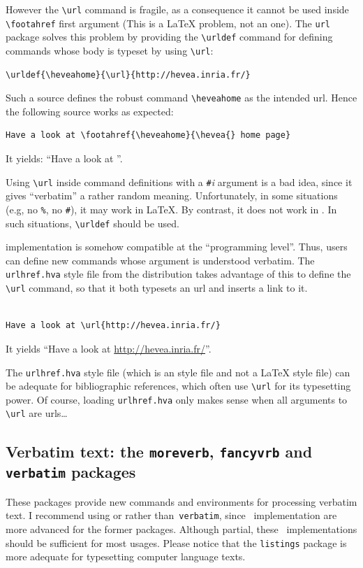 However the \verb+\url+ command is fragile, as a consequence it
cannot be used inside \verb+\footahref+ first argument (This is a
\LaTeX{} problem, not an \hevea{} one).
The \texttt{url} package solves this problem by providing the
\verb+\urldef+ command
for defining commands whose body is typeset by using \verb+\url+:
\begin{verbatim}
\urldef{\heveahome}{\url}{http://hevea.inria.fr/}
\end{verbatim}
%
Such a source defines the robust command \verb+\heveahome+ as the
intended url.
Hence the following source works as expected:
\begin{verbatim}
Have a look at \footahref{\heveahome}{\hevea{} home page}
\end{verbatim}
It yields: ``Have a look at ''.

Using \verb+\url+ inside command definitions with a
\verb+#+\textit{i} argument is a bad idea, since
it gives ``verbatim'' a rather random meaning.
Unfortunately, in some situations (e.g, no \verb+%+, no \verb+#+),
it may work in \LaTeX{}. By
contrast, it does not work in \hevea{}. In such situations,
\verb+\urldef+ should be used.

\hevea{} implementation is somehow compatible at the ``programming level''.
Thus, users can define new commands whose argument is understood
verbatim. The \texttt{urlhref.hva} style file
from the distribution
takes advantage of this to define the \verb+\url+ command, so that it both
typesets an url and inserts a link to it.
\begin{htmlonly}
\begin{verbatim}

Have a look at \url{http://hevea.inria.fr/}
\end{verbatim}
It yields ``Have a look at \url{http://hevea.inria.fr/}''.
\end{htmlonly}
The \texttt{urlhref.hva}
style file (which is an \hevea{} style file and not a \LaTeX{}
style file) can be adequate for bibliographic references,
which often use \verb+\url+ for its typesetting power.
Of course, loading \texttt{urlhref.hva} only makes sense when
all arguments to \verb+\url+ are urls\ldots

\subsection{Verbatim text: the \texttt{moreverb}, \texttt{fancyvrb} and
\texttt{verbatim} packages}
%
These packages provide new commands and environments for
processing verbatim text.
I recommend using
or 
rather than~\texttt{verbatim},
since \hevea~implementation are more advanced for the former packages.
Although partial, these \hevea~implementations should be sufficient for
most usages. Please notice that the \texttt{listings} package is
more adequate for typesetting computer language texts.

